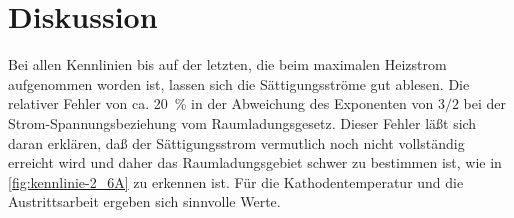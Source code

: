 
\section{Diskussion}

Bei allen Kennlinien bis auf der letzten, die beim maximalen Heizstrom
aufgenommen worden ist, lassen sich die Sättigungsströme gut ablesen.
Die relativer Fehler von ca. \SI{20}{\percent} in der Abweichung des
Exponenten von $3/2$ bei der Strom-Spannungsbeziehung vom
Raumladungsgesetz. Dieser Fehler läßt sich daran erklären, daß der
Sättigungsstrom vermutlich noch nicht vollständig erreicht wird und
daher das Raumladungsgebiet schwer zu bestimmen ist, wie in
\cref{fig:kennlinie-2_6A} zu erkennen ist. Für die Kathodentemperatur
und die Austrittsarbeit ergeben sich sinnvolle Werte.
